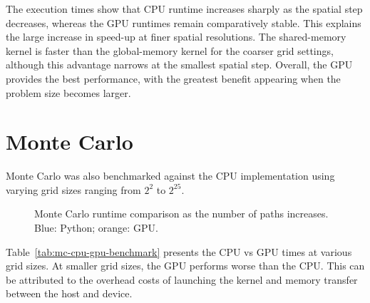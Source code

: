 \documentclass[11pt]{report}
\begin{document}
The execution times show that CPU runtime 
increases sharply as the spatial step decreases, 
whereas the GPU runtimes remain comparatively 
stable. This explains the large increase 
in speed-up at finer spatial resolutions. 
The shared-memory kernel is faster than the 
global-memory kernel for the coarser grid 
settings, although this advantage narrows 
at the smallest spatial step. Overall, the 
GPU provides the best performance, with the 
greatest benefit appearing when the problem 
size becomes larger.


\section{Monte Carlo}\label{sec:MCBencmark}
Monte Carlo was also benchmarked against the CPU implementation
using varying grid sizes ranging from $2^2$ to $2^25$. 

\begin{table}[H]
\centering
{}
\caption{Monte Carlo runtime comparison between CPU and GPU implementations.}
\label{tab:mc-cpu-gpu-benchmark}
\end{table}
\begin{figure}[H]
  \centering
  
  \caption{Monte Carlo runtime comparison as the number of paths increases. Blue: Python; orange: GPU.}
  \label{fig:cpu-gpu-monte-carlo-runtime}
\end{figure}

Table~\ref{tab:mc-cpu-gpu-benchmark} presents the CPU vs GPU times at various grid sizes.
At smaller grid sizes, the GPU performs worse than the CPU.
This can be attributed to the overhead costs of launching the kernel
and memory transfer between the host and device. 
\end{document}
